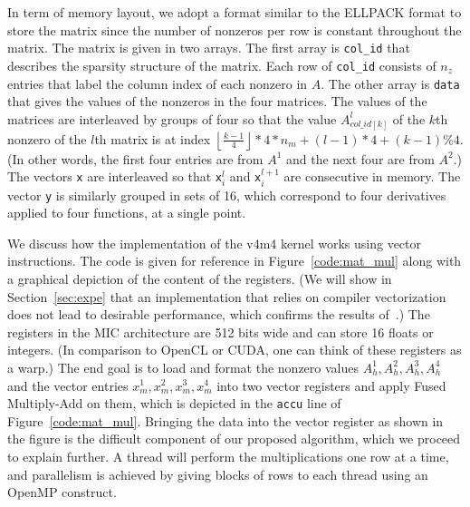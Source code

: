 \documentclass{sig-alternate}
\newcommand{\floor}[1]{\left\lfloor#1\right\rfloor}
\begin{document}
In term of memory layout, we adopt a format similar to the ELLPACK
format to store the matrix since the number of nonzeros per row is
constant throughout the matrix. The matrix is given in two arrays. The
first array is {\tt col\_id} that describes the
sparsity structure of the matrix. Each row of {\tt col\_id} consists
of $n_z$ entries that label the column index of each nonzero in
$A$. The other array is  {\tt data} that gives the values of
the nonzeros in the four matrices. The values of the matrices are
interleaved by groups of four so that the value $A^l_{col\_id[k]}$ of
the $k$th nonzero of the $l$th matrix is at index $\floor{\frac{k-1}{4}}*4*n_m + (l-1)*4+(k-1)\%4$.
(In other words, the first four entries are from $A^{1}$ and the 
next four are from $A^2$.) The vectors {\tt x} are
interleaved so that {\tt x}$^l_i$ and {\tt x}$^{l+1}_i$ are
consecutive in memory. The vector {\tt y} is similarly 
grouped in sets of 16, which correspond to four derivatives applied to
four functions, at a single point.


We discuss how the implementation of the v4m4 kernel works using
vector instructions. The code is given for reference in
Figure~\ref{code:mat_mul} along with a graphical depiction of the content of the registers. (We will show in Section~\ref{sec:expe}
that an implementation that relies on compiler vectorization does not lead
to desirable performance, which confirms the results
of~\cite{Saule13-ARXIV}.) The registers in the MIC architecture are
512 bits wide and can store 16 floats or integers. (In comparison to
OpenCL or CUDA, one can think of these registers as a warp.) The end
goal is to load and format the nonzero values $A_h^1,A_h^2,A_h^3,A_h^4$
and the vector entries $x_m^1,x_m^2,x_m^3,x_m^4$ into two vector registers and 
apply Fused Multiply-Add on them, which is depicted in the {\tt accu} line of 
Figure~\ref{code:mat_mul}. Bringing the data into the vector
register as shown in the figure is the difficult component of our 
proposed algorithm, which we proceed to explain further. 
A thread will perform the multiplications one row at a time,
and parallelism is achieved by giving blocks of rows to each thread
using an OpenMP construct.
\end{document}

